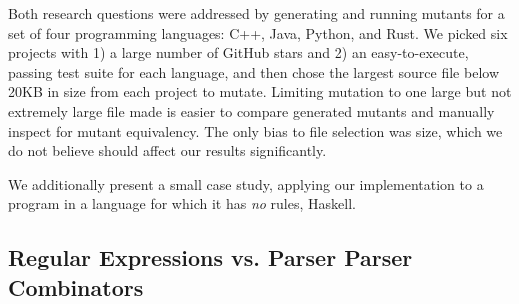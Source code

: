 \documentclass[sigconf,review, anonymous]{acmart}
\begin{document}
{Both research questions were addressed by generating and running
mutants for a set of four programming languages: C++, Java, Python,
and Rust.  We picked six projects with 1) a large number of GitHub
stars and 2) an easy-to-execute, passing test suite for each language,
and then chose the largest source file below 20KB in size from each project to mutate.  Limiting
mutation to one large but not extremely large file made is easier to compare generated mutants and
manually inspect for mutant equivalency.  The only bias to file
selection was size, which we do not believe should affect our results
significantly.

We additionally present a small
case study, applying our implementation to a program in a language for
which it has \emph{no} rules, Haskell.

\subsection{Regular Expressions vs. Parser Parser Combinators}


\begin{table}[hbtp]
\centering
\caption{C++ (Regex vs. Comby)}
\label{tab:table_cpp1}
\end{table}}
\end{document}
